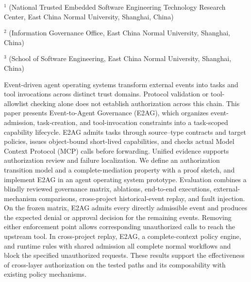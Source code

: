 \vspace{8pt}
\vspace{4pt}
\vspace{3pt}
\begingroup\fontsize{7.5pt}{10pt}\selectfont
\noindent$^{1}$ (National Trusted Embedded Software Engineering Technology Research Center, East China Normal University, Shanghai, China)\par
\noindent$^{2}$ (Information Governance Office, East China Normal University, Shanghai, China)\par
\noindent$^{3}$ (School of Software Engineering, East China Normal University, Shanghai, China)\par
\endgroup

\begin{josenabstract}
Event-driven agent operating systems transform external events into tasks and tool invocations across distinct trust domains. Protocol validation or tool-allowlist checking alone does not establish authorization across this chain. This paper presents Event-to-Agent Governance (E2AG), which organizes event-admission, task-creation, and tool-invocation constraints into a task-scoped capability lifecycle. E2AG admits tasks through source--type contracts and target policies, issues object-bound short-lived capabilities, and checks actual Model Context Protocol (MCP) calls before forwarding. Unified evidence supports authorization review and failure localization. We define an authorization transition model and a complete-mediation property with a proof sketch, and implement E2AG in an agent operating system prototype. Evaluation combines a blindly reviewed governance matrix, ablations, end-to-end executions, external-mechanism comparisons, cross-project historical-event replay, and fault injection. On the frozen matrix, E2AG admits every directly admissible event and produces the expected denial or approval decision for the remaining events. Removing either enforcement point allows corresponding unauthorized calls to reach the upstream tool. In cross-project replay, E2AG, a complete-context policy engine, and runtime rules with shared admission all complete normal workflows and block the specified unauthorized requests. These results support the effectiveness of cross-layer authorization on the tested paths and its composability with existing policy mechanisms.
\end{josenabstract}

\vspace{8pt}
